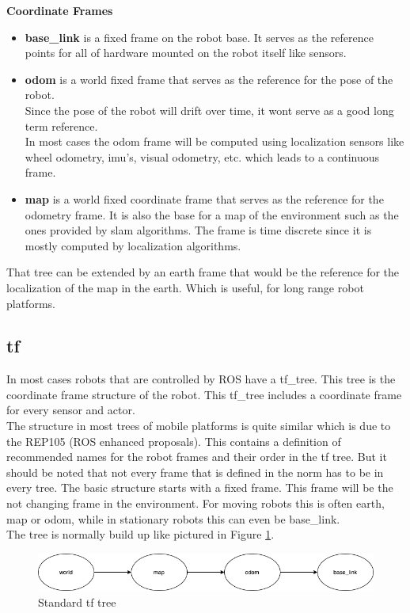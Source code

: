 	\textbf{Coordinate Frames}
	\begin{itemize}
		\item \textbf{base\_link} is a fixed frame on the robot base. It serves as the reference points for all of hardware mounted on the robot itself like sensors.
		\item \textbf{odom} is a world fixed frame that serves as the reference for the pose of the robot.\\ Since the pose of the robot will drift over time, it wont serve as a good long term reference.\\In most cases the odom frame will be computed using localization sensors like wheel odometry, imu's, visual odometry, etc. which leads to a continuous frame.
		\item \textbf{map} is a world fixed coordinate frame that serves as the reference for the odometry frame. It is also the base for a map of the environment such as the ones provided by slam algorithms. The frame is time discrete since it is mostly computed by localization algorithms.
	\end{itemize}
	
	That tree can be extended by an earth frame that would be the reference for the localization of the map in the earth. Which is useful, for long range robot platforms.\cite{REP105}
	
	
	
\subsection{tf}
In most cases robots that are controlled by ROS have a tf\_tree. This tree is the coordinate frame structure of the robot. This tf\_tree includes a coordinate frame for every sensor and actor.\\
 The structure in most trees of mobile platforms is quite similar which is due to the REP105 (ROS enhanced proposals). This contains a definition of recommended names for the robot frames and their order in the tf tree. But it should be noted that not every frame that is defined in the norm has to be in every tree. The basic structure starts with a fixed frame. This frame will be the not changing frame in the environment. For moving robots this is often earth, map or odom, while in stationary robots this can even be base\_link.\\
 

The tree is normally build up like pictured in Figure \ref{stdtftree}.


\begin{figure}[H]
	\includegraphics[width=\textwidth]{Pictures/tf standard tree}
	\caption{Standard tf tree}
	\label{stdtftree}
\end{figure}


